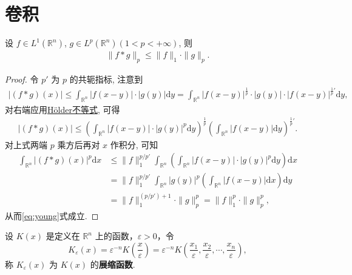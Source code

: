 \documentclass[../../main.tex]{subfiles}%
\begin{document}
\section{卷积}

\begin{theorem}[Young不等式]\label{theorem:实变函数--Young不等式}
设 $f\in L^1(\mathbb{R}^n)$, $g\in L^p(\mathbb{R}^n)(1<p<+\infty)$, 则
\begin{align}
\|f*g\|_p \leqslant \|f\|_1 \cdot \|g\|_p.
\label{eq:young}
\end{align}
\end{theorem}
\begin{proof}

令 $p'$ 为 $p$ 的共轭指标, 注意到
\begin{align*}
|(f*g)(x)| \leqslant \int_{\mathbb{R}^n} |f(x-y)| \cdot |g(y)| \mathrm{d}y 
= \int_{\mathbb{R}^n} |f(x-y)|^{\frac{1}{p}} \cdot |g(y)| \cdot |f(x-y)|^{\frac{1}{p}'} \mathrm{d}y,
\end{align*}
对右端应用\hyperref[theorem:实变函数--Hölder不等式]{Hölder不等式}, 可得
\begin{align*}
|(f*g)(x)| \leqslant \left( \int_{\mathbb{R}^n} |f(x-y)| \cdot |g(y)|^p \mathrm{d}y \right)^{\frac{1}{p}} \left( \int_{\mathbb{R}^n} |f(x-y)| \mathrm{d}y \right)^{\frac{1}{p}'}.
\end{align*}
对上式两端 $p$ 乘方后再对 $x$ 作积分, 可知
\begin{align*}
\int_{\mathbb{R}^n} |(f*g)(x)|^p \mathrm{d}x
&\leqslant \|f\|_1^{p/p'} \int_{\mathbb{R}^n} \left( \int_{\mathbb{R}^n} |f(x-y)| \cdot |g(y)|^p \mathrm{d}y \right) \mathrm{d}x \\
&= \|f\|_1^{p/p'} \int_{\mathbb{R}^n} |g(y)|^p \left( \int_{\mathbb{R}^n} |f(x-y)| \mathrm{d}x \right) \mathrm{d}y \\
&= \|f\|_1^{(p/p')+1} \cdot \|g\|_p^p = \|f\|_1^p \cdot \|g\|_p^p,
\end{align*}
从而\eqref{eq:young}式成立.

\end{proof}

\begin{definition}[展缩函数]\label{definition:展缩函数}
设 \( K(x) \) 是定义在 \( \mathbb{R}^n \) 上的函数，\( \varepsilon > 0 \)，令
\[
K_{\varepsilon}(x) = \varepsilon^{-n} K\left( \frac{x}{\varepsilon} \right) = \varepsilon^{-n} K\left( \frac{x_1}{\varepsilon}, \frac{x_2}{\varepsilon}, \cdots, \frac{x_n}{\varepsilon} \right),
\]
称 \( K_{\varepsilon}(x) \) 为 \( K(x) \) 的\textbf{展缩函数}.
\end{definition}
\end{document}
